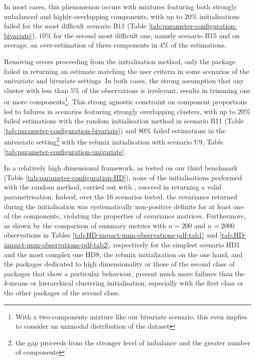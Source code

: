 In most cases, this phenomenon occurs with mixtures featuring both strongly unbalanced and highly-overlapping components, with up to \(20\%\) initialisations failed for the most difficult scenario B11 (Table \ref{tab:parameter-configuration-bivariate}), \(10\%\) for the second most difficult one, namely scenario B15 and on average, an over-estimation of three components in \(4\%\) of the estimations.

Removing errors proceeding from the initialisation method, only the  package failed in returning an estimate matching the user criteria in some scenarios of the univariate and bivariate settings. In both cases, the strong assumption that any cluster with less than \(5\%\) of the observations is irrelevant, results in trimming one or more components\footnote{With a two-components mixture like our bivariate scenario, this even implies to consider an unimodal distribution of the dataset}. This strong agnostic constraint on component proportions led to failures in scenarios featuring strongly overlapping clusters, with up to \(20\%\) failed estimations with the random initialisation method in scenario B11 (Table \ref{tab:parameter-configuration-bivariate}) and \(80\%\) failed estimations in the univariate setting\footnote{the gap proceeds from the stronger level of imbalance and the greater number of components} with the rebmix initialisation with scenario U9, Table \ref{tab:parameter-configuration-univariate}.

\color{blue}

In a relatively high dimensional framework, as tested on our third benchmark (Table \ref{tab:parameter-configuration-HD}), none of the initialisations performed with the random method, carried out with , succeed in returning a valid parametrisation. Indeed, over the 16 scenarios tested, the covariance returned during the initialisation was systematically non-positive definite for at least one of the components, violating the properties of covariance matrices.
Furthermore, as shown by the comparison of summary metrics with \(n=200\) and \(n=2000\) observations in Tables \ref{tab:HD-impact-num-observations-pdf-tab1}
and \ref{tab:HD-impact-num-observations-pdf-tab2}, respectively for the simplest scenario HD1 and the most complex one HD8, the rebmix initialization on the one hand, and the packages dedicated to high dimensionality or those of the second class of packages that show a particular behaviour, present much more failures than the \emph{k}-means or hierarchical clustering initialisation, especially with the first class or the other packages of the second class.
\color{black}


